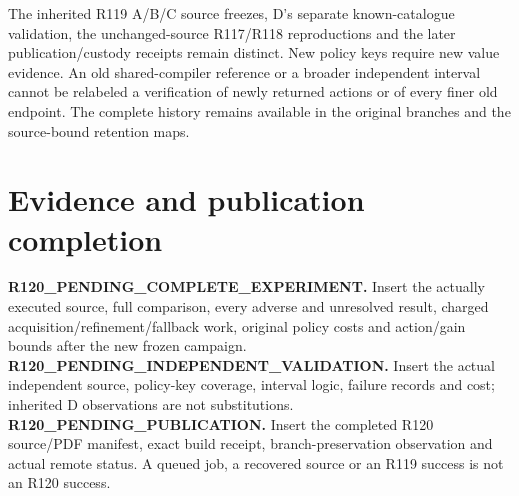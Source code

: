 The inherited R119 A/B/C source freezes, D's separate known-catalogue
validation, the unchanged-source R117/R118 reproductions and the later
publication/custody receipts remain distinct. New policy keys require new
value evidence. An old shared-compiler reference or a broader independent
interval cannot be relabeled a verification of newly returned actions or
of every finer old endpoint. The complete history remains available in
the original branches and the source-bound retention maps.

\section{Evidence and publication completion}
\textbf{R120\_PENDING\_COMPLETE\_EXPERIMENT.}
Insert the actually executed source, full comparison, every adverse and
unresolved result, charged acquisition/refinement/fallback work, original
policy costs and action/gain bounds after the new frozen campaign.
\textbf{R120\_PENDING\_INDEPENDENT\_VALIDATION.}
Insert the actual independent source, policy-key coverage, interval logic,
failure records and cost; inherited D observations are not substitutions.
\textbf{R120\_PENDING\_PUBLICATION.}
Insert the completed R120 source/PDF manifest, exact build receipt,
branch-preservation observation and actual remote status. A queued job,
a recovered source or an R119 success is not an R120 success.
